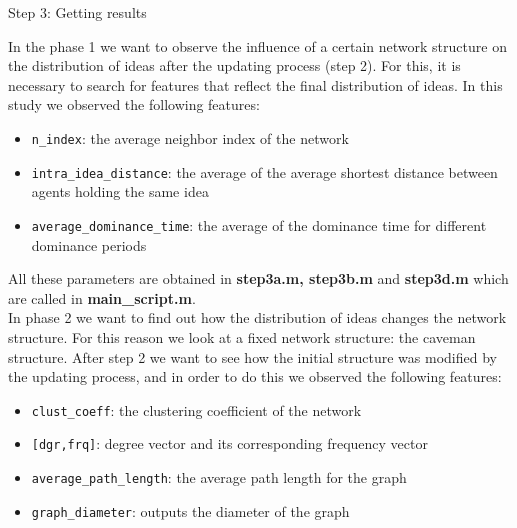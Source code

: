 \documentclass{beamer}
\begin{document}
%
\begin{frame}
{Step 3: Getting results}

In the phase 1 we want to observe the influence of a certain network structure  on the distribution of ideas after the updating process (step 2). For this, it is necessary to search for features that reflect the final distribution of ideas. In this study we observed the following features:

\begin{itemize}
\item \verb+n_index+: the average neighbor index of the network
\item \verb+intra_idea_distance+: the average of the average shortest distance between agents holding the same idea
\item \verb+average_dominance_time+: the average of the dominance time for different dominance periods
\end{itemize}

\noindent All these parameters are obtained in \textbf{step3a.m, step3b.m} and \textbf{step3d.m} which are called in \textbf{main\_script.m}.
\\

\noindent In phase 2 we want to find out how the distribution of ideas changes the network structure. For this reason we look at a fixed network structure: the caveman structure. After step 2 we want to see how the initial structure was modified by the updating process, and in order to do this we observed the following features:

\begin{itemize}
\item \verb+clust_coeff+: the clustering coefficient of the network
\item  \verb+[dgr,frq]+: degree vector and its corresponding frequency vector 
\item \verb+average_path_length+: the average path length for the graph
\item \verb+graph_diameter+: outputs the diameter of the graph 

\end{itemize}

\end{frame}
%
\end{document}

